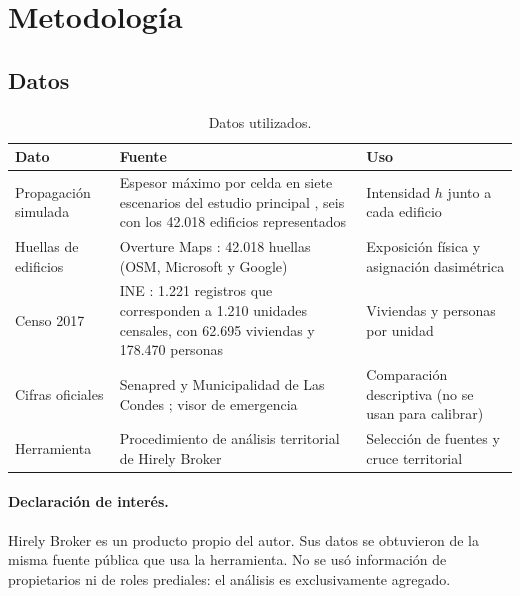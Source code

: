 \documentclass[10pt,a4paper]{article}
\begin{document}
\section{Metodología}
\subsection{Datos}
\begin{table}[htbp]\centering\small
\caption{Datos utilizados.}\label{tab:datos}
\begin{tabular}{p{}p{}p{}}\toprule
Dato & Fuente & Uso\\\midrule
Propagación simulada & Espesor máximo por celda en siete escenarios del estudio principal \citep{wood2026}, seis con los 42.018 edificios representados & Intensidad $h$ junto a cada edificio\\
Huellas de edificios & Overture Maps \citep{overture2026}: 42.018 huellas (OSM, Microsoft y Google) & Exposición física y asignación dasimétrica\\
Censo 2017 & INE \citep{ine2017manzanas}: 1.221 registros que corresponden a 1.210 unidades censales, con 62.695 viviendas y 178.470 personas & Viviendas y personas por unidad\\
Cifras oficiales & Senapred y Municipalidad de Las Condes \citep{senapred2026latribuna,cnn2026balance,latercera2026senapred}; visor de emergencia \citep{bbnn2026visor} & Comparación descriptiva (no se usan para calibrar)\\
Herramienta & Procedimiento de análisis territorial de Hirely Broker \citep{hirelybroker2026} & Selección de fuentes y cruce territorial\\
\bottomrule\end{tabular}\end{table}

\paragraph{Declaración de interés.} Hirely Broker es un producto propio del autor. Sus datos se obtuvieron de la misma fuente pública que usa la herramienta. No se usó información de propietarios ni de roles prediales: el análisis es exclusivamente agregado.
\end{document}
